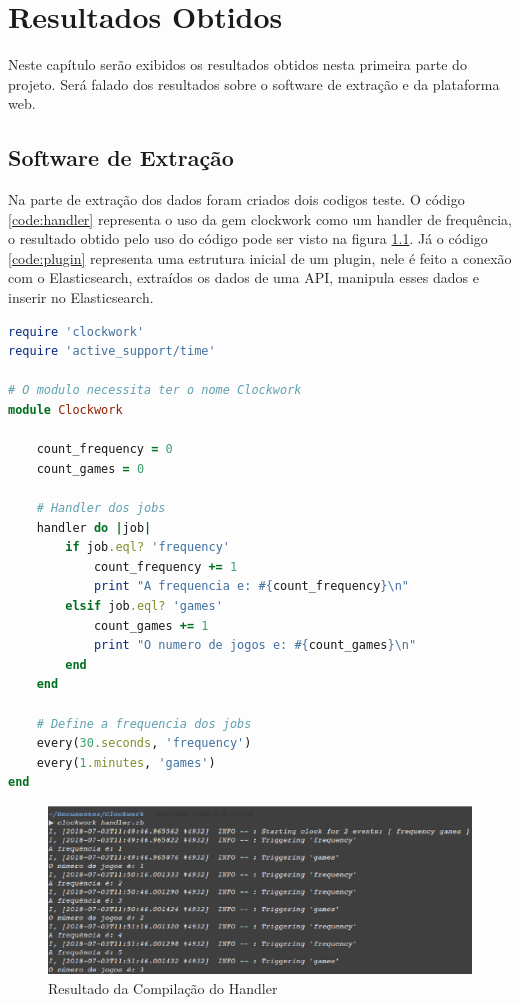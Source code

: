 \chapter[Resultados Obtidos]{Resultados Obtidos}
Neste capítulo serão exibidos os resultados obtidos nesta primeira parte do projeto. Será falado dos resultados sobre o software de extração e da plataforma web.
\section{Software de Extração}
Na parte de extração dos dados foram criados dois codigos teste. O código \ref{code:handler} representa o uso da gem clockwork como um handler de frequência, o resultado obtido pelo uso do código pode ser visto na figura \ref{image:result_handler}. Já o código \ref{code:plugin} representa uma estrutura inicial de um plugin, nele é feito a conexão com o Elasticsearch, extraídos os dados de uma API, manipula esses dados e inserir no Elasticsearch.
\begin{lstlisting}[language={Ruby}, caption = {Código do Handler}, label = {code:handler}]
require 'clockwork'
require 'active_support/time'

# O modulo necessita ter o nome Clockwork
module Clockwork

	count_frequency = 0
	count_games = 0

	# Handler dos jobs
	handler do |job|
		if job.eql? 'frequency'
			count_frequency += 1
			print "A frequencia e: #{count_frequency}\n"
		elsif job.eql? 'games'
			count_games += 1
			print "O numero de jogos e: #{count_games}\n"
		end
	end

	# Define a frequencia dos jobs
	every(30.seconds, 'frequency')
	every(1.minutes, 'games')
end
\end{lstlisting}
\begin{figure}
\centering
\includegraphics[scale=0.6]{figuras/result_handler.eps}
\caption{Resultado da Compilação do Handler}
\label{image:result_handler}
\end{figure}
